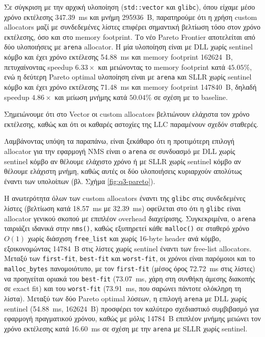 \documentclass[12pt]{article}
\begin{document}
Σε σύγκριση με την αρχική υλοποίηση (\texttt{std::vector} και \texttt{glibc}), όπου είχαμε μέσο χρόνο εκτέλεσης \qty{347.39}{\milli\second} και μνήμη \qty{295936}{B}, παρατηρούμε ότι η χρήση custom allocators μαζί με συνδεδεμένες λίστες επιφέρει σημαντική βελτίωση τόσο στον χρόνο εκτέλεσης, όσο και στο memory footprint. Το νέο Pareto Frontier αποτελείται από δύο υλοποιήσεις με \texttt{arena} allocator. Η μία υλοποίηση είναι με DLL χωρίς sentinel κόμβο και έχει χρόνο εκτέλεσης \qty{54.88}{\milli\second} και memory footprint \qty{162624}{B}, πετυχαίνοντας speedup $6.33\times$ και μειώνοντας το memory footprint κατά $45.05\%$, ενώ η δεύτερη Pareto optimal υλοποίηση είναι με \texttt{arena} και SLLR χωρίς sentinel κόμβο και έχει χρόνο εκτέλεσης \qty{71.48}{\milli\second} και memory footprint \qty{147840}{B}, δηλαδή speedup $4.86\times$ και μείωση μνήμης κατά $50.04\%$ σε σχέση με το baseline.

Σημειώνουμε ότι στο Vector οι custom allocators βελτιώνουν ελάχιστα τον χρόνο εκτέλεσης, καθώς και ότι οι καθαρές αστοχίες της LLC παραμένουν σχεδόν σταθερές.

Λαμβάνοντας υπόψη τα παραπάνω, είναι ξεκάθαρο ότι η προτιμότερη επιλογή allocator για την εφαρμογή NMS είναι ο \texttt{arena} σε συνδυασμό με DLL χωρίς sentinel κόμβο αν θέλουμε ελάχιστο χρόνο ή με SLLR χωρίς sentinel κόμβο αν θέλουμε ελάχιστη μνήμη, καθώς αυτές οι δύο υλοποιήσεις κυριαρχούν απολύτως έναντι των υπολοίπων (βλ. Σχήμα \ref{fig:q3-pareto}).

Η ανωτερότητα όλων των custom allocators έναντι της \texttt{glibc} στις συνδεδεμένες λίστες (βελτίωση κατά \qty{18.57}{\milli\second} με \qty{32.39}{\milli\second}) οφείλεται στο ότι η \texttt{glibc} είναι allocator γενικού σκοπού με επιπλέον overhead διαχείρισης. Συγκεκριμένα, ο \texttt{arena} ταιριάζει ιδανικά στην \texttt{nms()}, καθώς εξυπηρετεί κάθε \texttt{malloc()} σε σταθερό χρόνο $O(1)$ χωρίς διάσχιση \texttt{free\_list} και χωρίς 16-byte header ανά κόμβο, εξοικονομώντας \qty{14784}{B} στις λίστες χωρίς sentinel έναντι των free-list allocators. Μεταξύ των \texttt{first-fit}, \texttt{best-fit} και \texttt{worst-fit}, οι χρόνοι είναι παρόμοιοι και το \texttt{malloc\_bytes} πανομοιότυπο, με τον \texttt{first-fit} (μέσος όρος \qty{72.72}{\milli\second} στις λίστες) να προηγείται οριακά του \texttt{best-fit} (\qty{73.07}{\milli\second}, χάρη στη συνθήκη άμεσης διακοπής σε exact fit) και του \texttt{worst-fit} (\qty{73.91}{\milli\second}, που σαρώνει πάντοτε ολόκληρη τη λίστα). Μεταξύ των δύο Pareto optimal λύσεων, η επιλογή \texttt{arena} με DLL χωρίς sentinel (\qty{54.88}{\milli\second}, \qty{162624}{B}) προσφέρει τον καλύτερο σχεδιαστικό συμβιβασμό για εφαρμογή πραγματικού χρόνου, καθώς με μόλις \qty{14784}{B} επιπλέον μνήμης μειώνει τον χρόνο εκτέλεσης κατά \qty{16.60}{\milli\second} σε σχέση με την \texttt{arena} με SLLR χωρίς sentinel.
\end{document}
